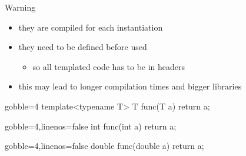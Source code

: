 \begin{frame}[fragile]
  \begin{alertblock}{Warning}
    \begin{itemize}
      \item they are compiled for each instantiation
      \item they need to be defined before used
      \begin{itemize}
        \item so all templated code has to be in headers
      \end{itemize}
      \item this may lead to longer compilation times and bigger libraries
    \end{itemize}
  \end{alertblock}
  \newsavebox{\codepiece}
  \begin{lrbox}{\codepiece}
    \begin{minipage}{.35\linewidth}
      \small
      \begin{cppcode*}{gobble=4}
        template<typename T>
        T func(T a) {
          return a;
        }
      \end{cppcode*}
    \end{minipage}
  \end{lrbox}
  \newsavebox{\codepiecea}
  \begin{lrbox}{\codepiecea}
    \begin{minipage}{.4\linewidth}
      \small
      \begin{cppcode*}{gobble=4,linenos=false}
        int func(int a) {
          return a;
        }
      \end{cppcode*}
    \end{minipage}
  \end{lrbox}
  \newsavebox{\codepieceb}
  \begin{lrbox}{\codepieceb}
    \begin{minipage}{.4\linewidth}
      \small
      \begin{cppcode*}{gobble=4,linenos=false}
        double func(double a) {
          return a;
        }
      \end{cppcode*}
    \end{minipage}
  \end{lrbox}
\end{frame}

